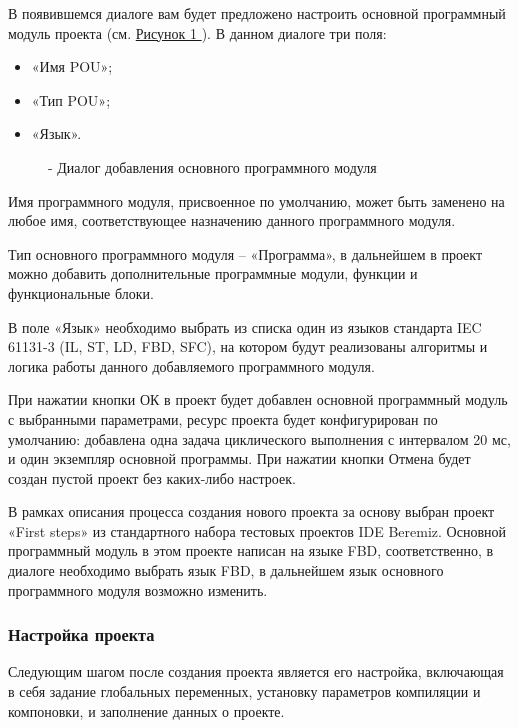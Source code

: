 \documentclass[letterpaper,10pt,russian]{sphinxmanual}
\begin{document}
В появившемся диалоге вам будет предложено настроить основной
программный модуль проекта (см. \hyperref[usage_guide/work_with_project:image146]{Рисунок \ref{usage_guide/work_with_project:image146} }). В данном диалоге три поля:
\begin{itemize}
\item {} 
«Имя POU»;

\item {} 
«Тип POU»;

\item {} 
«Язык».

\end{itemize}
\begin{figure}[htbp]
\centering
\capstart

\noindent{}
\caption{- Диалог добавления основного программного модуля}\label{usage_guide/work_with_project:image146}\end{figure}

Имя программного модуля, присвоенное по умолчанию, может быть заменено
на любое имя, соответствующее назначению данного программного модуля.

Тип основного программного модуля – «Программа», в дальнейшем в проект
можно добавить дополнительные программные модули, функции и
функциональные блоки.

В поле «Язык» необходимо выбрать из списка один из языков стандарта IEC
61131-3 (IL, ST, LD, FBD, SFC), на котором будут реализованы алгоритмы и
логика работы данного добавляемого программного модуля.

При нажатии кнопки ОК в проект будет добавлен основной программный
модуль с выбранными параметрами, ресурс проекта будет конфигурирован по
умолчанию: добавлена одна задача циклического выполнения с интервалом 20
мс, и один экземпляр основной программы. При нажатии кнопки
Отмена будет создан пустой проект без каких-либо настроек.

В рамках описания процесса создания нового проекта за основу выбран
проект «First steps» из стандартного набора тестовых проектов IDE
Beremiz. Основной программный модуль в этом проекте написан на языке
FBD, соответственно, в диалоге необходимо выбрать язык FBD, в дальнейшем
язык основного программного модуля возможно изменить.


\subsubsection{Настройка проекта}
\label{usage_guide/work_with_project:id3}
Следующим шагом после создания проекта является его настройка,
включающая в себя задание глобальных переменных, установку параметров
компиляции и компоновки, и заполнение данных о проекте.
\end{document}
